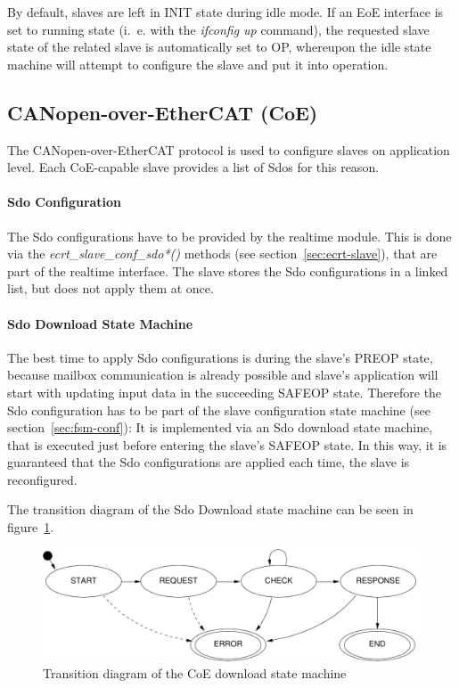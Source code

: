 \documentclass[a4paper,12pt,BCOR6mm,bibtotoc,idxtotoc]{scrbook}
\begin{document}
By default, slaves are left in INIT state during idle mode. If an EoE
interface is set to running state (i.~e. with the \textit{ifconfig up}
command), the requested slave state of the related slave is
automatically set to OP, whereupon the idle state machine will attempt
to configure the slave and put it into operation.


\subsection{CANopen-over-EtherCAT (CoE)}
\label{sec:coeimp}

The CANopen-over-EtherCAT protocol \cite[section~5.6]{alspec} is used
to configure slaves on application level. Each CoE-capable slave
provides a list of Sdos for this reason.

\paragraph{Sdo Configuration}

The Sdo configurations have to be provided by the realtime module.
This is done via the \textit{ecrt\_slave\_conf\_sdo*()} methods (see
section~\ref{sec:ecrt-slave}), that are part of the realtime
interface. The slave stores the Sdo configurations in a linked list,
but does not apply them at once.

\paragraph{Sdo Download State Machine}

The best time to apply Sdo configurations is during the slave's PREOP
state, because mailbox communication is already possible and slave's
application will start with updating input data in the succeeding
SAFEOP state. Therefore the Sdo configuration has to be part of the
slave configuration state machine (see section~\ref{sec:fsm-conf}): It
is implemented via an Sdo download state machine, that is executed
just before entering the slave's SAFEOP state. In this way, it is
guaranteed that the Sdo configurations are applied each time, the
slave is reconfigured.

The transition diagram of the Sdo Download state machine can be seen
in figure~\ref{fig:fsm-coedown}.

\begin{figure}[htbp]
  \centering
  \includegraphics[width=.9\textwidth]{images/fsm-coedown}
  \caption{Transition diagram of the CoE download state machine}
  \label{fig:fsm-coedown}
\end{figure}
\end{document}
